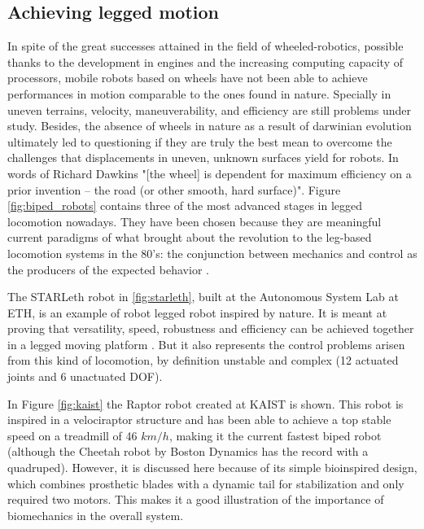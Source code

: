 
\subsection{Achieving legged motion} %
\label{sub:legged_motion_in_robotics}
In spite of the great successes attained in the field of wheeled-robotics, possible thanks to the development in engines and the increasing computing capacity of processors, mobile robots based on wheels have not been able to achieve performances in motion comparable to the ones found in nature.
Specially in uneven terrains, velocity, maneuverability, and efficiency are still problems under study.
Besides, the absence of wheels in nature as a result of darwinian evolution ultimately led to questioning \cite{dawkins} if they are truly the best mean to overcome the challenges that displacements in uneven, unknown surfaces yield for robots.
In words of Richard Dawkins \cite{dawkins} "[the wheel] is dependent for maximum efficiency on a prior invention – the road (or other smooth, hard surface)". 
Figure \ref{fig:biped_robots} contains three of the most advanced stages in legged locomotion nowadays.
They have been chosen because they are meaningful current paradigms of what brought about the revolution to the leg-based locomotion systems in the 80's: the conjunction between mechanics and control as the producers of the expected behavior \cite{mit_leg_lab1}.

The STARLeth robot in \ref{fig:starleth}, built at the Autonomous System Lab at ETH, is an example of robot legged robot inspired by nature. 
It is meant at proving that versatility, speed, robustness and efficiency can be achieved together in a legged moving platform \cite{starleth}.
But it also represents the control problems arisen from this kind of locomotion, by definition unstable and complex (12 actuated joints and 6 unactuated DOF). 

In Figure \ref{fig:kaist} the Raptor robot created at KAIST is shown.
This robot is inspired in a velociraptor structure and has been able to achieve a top stable speed on a treadmill of 46 $km/h$, making it the current fastest biped robot (although the Cheetah robot by Boston Dynamics has the record with a quadruped).
However, it is discussed here because of its simple bioinspired design, which combines prosthetic blades with a dynamic tail for stabilization and only required two motors.
This makes it a good illustration of the importance of biomechanics in the overall system.


